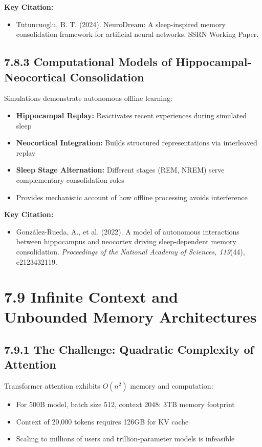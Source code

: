 \documentclass[11pt,letterpaper]{article}
\begin{document}
\textbf{Key Citation:}
\begin{itemize}[leftmargin=*]
    \item Tutuncuoglu, B. T. (2024). NeuroDream: A sleep-inspired memory consolidation framework for artificial neural networks. SSRN Working Paper.
\end{itemize}

\subsection{7.8.3 Computational Models of Hippocampal-Neocortical Consolidation}

Simulations demonstrate autonomous offline learning:

\begin{itemize}[leftmargin=*]
    \item \textbf{Hippocampal Replay:} Reactivates recent experiences during simulated sleep
    \item \textbf{Neocortical Integration:} Builds structured representations via interleaved replay
    \item \textbf{Sleep Stage Alternation:} Different stages (REM, NREM) serve complementary consolidation roles
    \item Provides mechanistic account of how offline processing avoids interference
\end{itemize}

\textbf{Key Citation:}
\begin{itemize}[leftmargin=*]
    \item González-Rueda, A., et al. (2022). A model of autonomous interactions between hippocampus and neocortex driving sleep-dependent memory consolidation. \textit{Proceedings of the National Academy of Sciences, 119}(44), e2123432119.
\end{itemize}

\section{\color{garnet}7.9 Infinite Context and Unbounded Memory Architectures}

\subsection{7.9.1 The Challenge: Quadratic Complexity of Attention}

Transformer attention exhibits $O(n^2)$ memory and computation:

\begin{itemize}[leftmargin=*]
    \item For 500B model, batch size 512, context 2048: 3TB memory footprint
    \item Context of 20,000 tokens requires 126GB for KV cache
    \item Scaling to millions of users and trillion-parameter models is infeasible
\end{itemize}
\end{document}
